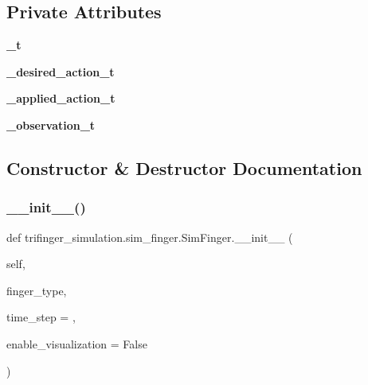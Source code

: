 \subsection*{Private Attributes}
\begin{DoxyCompactItemize}
\item 
\mbox{\label{classtrifinger__simulation_1_1sim__finger_1_1SimFinger_a782e9d0d2a0bc5ad87ad7a826d8f5e40}} 
{\bfseries \+\_\+t}
\item 
\mbox{\label{classtrifinger__simulation_1_1sim__finger_1_1SimFinger_a37d29f33684c35e5c1e06456145d7308}} 
{\bfseries \+\_\+desired\+\_\+action\+\_\+t}
\item 
\mbox{\label{classtrifinger__simulation_1_1sim__finger_1_1SimFinger_a4050222bee7230c4a2529fddf36dd9fb}} 
{\bfseries \+\_\+applied\+\_\+action\+\_\+t}
\item 
\mbox{\label{classtrifinger__simulation_1_1sim__finger_1_1SimFinger_ab21731192738ee73f1a04a5e9663e2c1}} 
{\bfseries \+\_\+observation\+\_\+t}
\end{DoxyCompactItemize}


\subsection{Constructor \& Destructor Documentation}
\mbox{\label{classtrifinger__simulation_1_1sim__finger_1_1SimFinger_a3bf64d6f490e704bfe3626bd0125451a}} 
\subsubsection{\texorpdfstring{\+\_\+\+\_\+init\+\_\+\+\_\+()}{\_\_init\_\_()}}
{\footnotesize\ttfamily def trifinger\+\_\+simulation.\+sim\+\_\+finger.\+Sim\+Finger.\+\_\+\+\_\+init\+\_\+\+\_\+ (\begin{DoxyParamCaption}\item[{}]{self,  }\item[{}]{finger\+\_\+type,  }\item[{}]{time\+\_\+step = {},  }\item[{}]{enable\+\_\+visualization = {\ttfamily False} }\end{DoxyParamCaption})}



